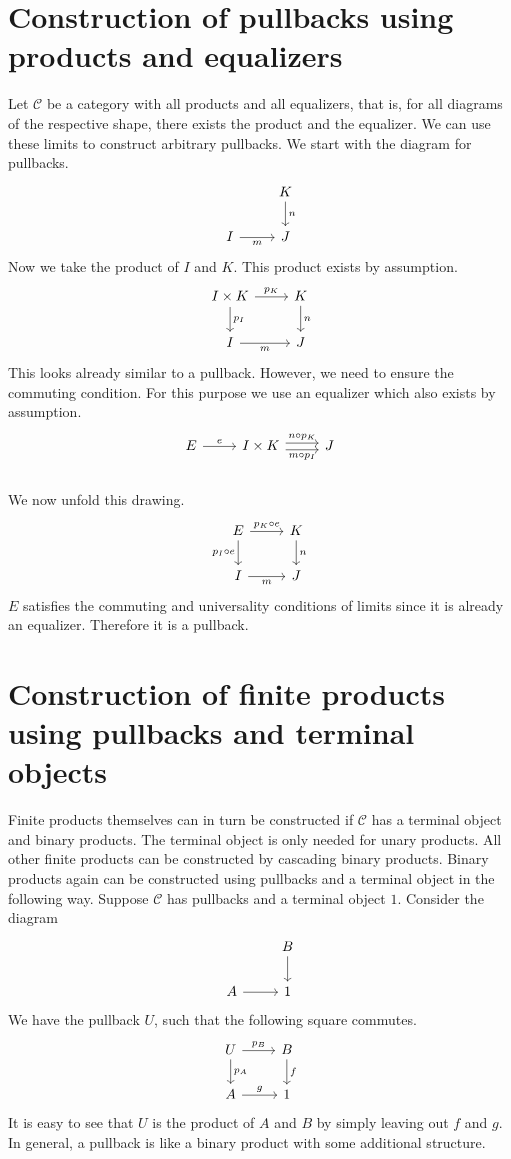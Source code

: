 \section{Construction of pullbacks using products and equalizers}
Let $\mathscr C$ be a category with all products and all equalizers,
that is, for all diagrams of the respective shape, there exists the product
and the equalizer.
We can use these limits to construct arbitrary pullbacks.
We start with the diagram for pullbacks.
\[
  \begin{tikzcd}
    & K \arrow{d}{n} \\
    I \arrow[swap]{r}{m} & J
  \end{tikzcd}
\]
Now we take the product of $I$ and $K$. This product exists by assumption.
\[
  \begin{tikzcd}
    I \times K \arrow{r}{p_K} \arrow{d}{p_I} & K \arrow{d}{n} \\
    I \arrow[swap]{r}{m} & J
  \end{tikzcd}
\]
This looks already similar to a pullback.
However, we need to ensure the commuting condition.
For this purpose we use an equalizer which also exists by assumption.
\[
  \begin{tikzcd}
    E \arrow{r}{e} &
    I \times K
    \arrow[r,shift right,swap, "m \circ p_I"] \arrow[r,shift left, "n \circ p_K"]
    & J \\
  \end{tikzcd}
\]
We now unfold this drawing.
\[
  \begin{tikzcd}
    E \arrow[swap]{d}{p_I \circ e} \arrow{r}{p_K \circ e} & K \arrow{d}{n} \\
    I \arrow[swap]{r}{m} & J
  \end{tikzcd}
\]
$E$ satisfies the commuting and universality conditions of limits
since it is already an equalizer.
Therefore it is a pullback.

\section{Construction of finite products using pullbacks and terminal objects}

Finite products themselves can in turn be constructed if $\mathscr C$
has a terminal object and binary products. The terminal object is
only needed for unary products. All other finite products
can be constructed by cascading binary products.
Binary products again can be constructed using pullbacks and a terminal object
in the following way.
Suppose $\mathscr C$ has pullbacks and a terminal object $1$. Consider the diagram
\[
  \begin{tikzcd}
    & B \arrow{d} \\
    A \arrow{r} & 1
  \end{tikzcd}
\]
We have the pullback $U$, such that the following square commutes.
\[
  \begin{tikzcd}
    U \arrow{r}{p_B} \arrow{d}{p_A} & B \arrow{d}{f} \\
    A \arrow{r}{g} & 1
  \end{tikzcd}
\]
It is easy to see that $U$ is the product of $A$ and $B$ by
simply leaving out $f$ and $g$. In general, a pullback
is like a binary product with some additional structure.

